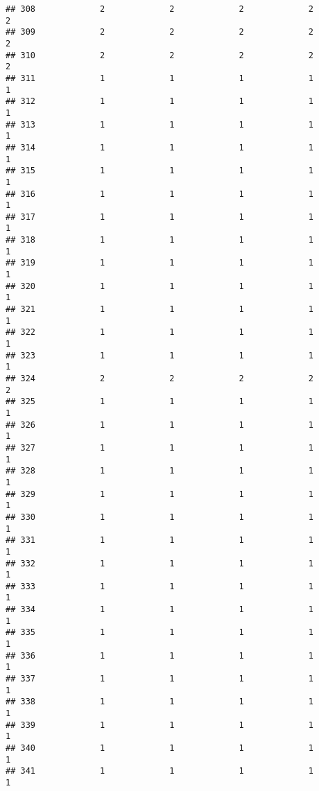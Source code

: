 \documentclass[
]{article}
\begin{document}
\begin{verbatim}
## 308             2             2             2             2             2
## 309             2             2             2             2             2
## 310             2             2             2             2             2
## 311             1             1             1             1             1
## 312             1             1             1             1             1
## 313             1             1             1             1             1
## 314             1             1             1             1             1
## 315             1             1             1             1             1
## 316             1             1             1             1             1
## 317             1             1             1             1             1
## 318             1             1             1             1             1
## 319             1             1             1             1             1
## 320             1             1             1             1             1
## 321             1             1             1             1             1
## 322             1             1             1             1             1
## 323             1             1             1             1             1
## 324             2             2             2             2             2
## 325             1             1             1             1             1
## 326             1             1             1             1             1
## 327             1             1             1             1             1
## 328             1             1             1             1             1
## 329             1             1             1             1             1
## 330             1             1             1             1             1
## 331             1             1             1             1             1
## 332             1             1             1             1             1
## 333             1             1             1             1             1
## 334             1             1             1             1             1
## 335             1             1             1             1             1
## 336             1             1             1             1             1
## 337             1             1             1             1             1
## 338             1             1             1             1             1
## 339             1             1             1             1             1
## 340             1             1             1             1             1
## 341             1             1             1             1             1

\end{verbatim}
\end{document}
